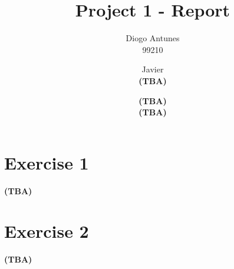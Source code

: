 \documentclass[12pt]{article}
\newcommand{\tba}{\textbf{(TBA) }}
\begin{document}
\title{Project 1 - Report}
\author{
  Diogo Antunes\\
  99210
  \and
  Javier\\
  \tba
  \and
  \tba\\
  \tba
}

\maketitle

\section*{Exercise 1}

\tba

\section*{Exercise 2}

\tba
\end{document}
